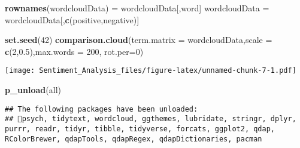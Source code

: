 \documentclass[
]{article}
\newenvironment{Shaded}{\begin{snugshade}}{\end{snugshade}}
\newcommand{\AttributeTok}[1]{\textcolor[rgb]{0.13,0.29,0.53}{#1}}
\newcommand{\DecValTok}[1]{\textcolor[rgb]{0.00,0.00,0.81}{#1}}
\newcommand{\FloatTok}[1]{\textcolor[rgb]{0.00,0.00,0.81}{#1}}
\newcommand{\FunctionTok}[1]{\textcolor[rgb]{0.13,0.29,0.53}{\textbf{#1}}}
\newcommand{\NormalTok}[1]{#1}
\newcommand{\OtherTok}[1]{\textcolor[rgb]{0.56,0.35,0.01}{#1}}
\newcommand{\StringTok}[1]{\textcolor[rgb]{0.31,0.60,0.02}{#1}}
\begin{document}
\begin{Shaded}
\begin{Highlighting}[]
\FunctionTok{rownames}\NormalTok{(wordcloudData) }\OtherTok{=}\NormalTok{ wordcloudData[,}\StringTok{\textquotesingle{}word\textquotesingle{}}\NormalTok{]}
\NormalTok{wordcloudData }\OtherTok{=}\NormalTok{ wordcloudData[,}\FunctionTok{c}\NormalTok{(}\StringTok{\textquotesingle{}positive\textquotesingle{}}\NormalTok{,}\StringTok{\textquotesingle{}negative\textquotesingle{}}\NormalTok{)]}

\FunctionTok{set.seed}\NormalTok{(}\DecValTok{42}\NormalTok{)}
\FunctionTok{comparison.cloud}\NormalTok{(}\AttributeTok{term.matrix =}\NormalTok{ wordcloudData,}\AttributeTok{scale =} \FunctionTok{c}\NormalTok{(}\DecValTok{2}\NormalTok{,}\FloatTok{0.5}\NormalTok{),}\AttributeTok{max.words =} \DecValTok{200}\NormalTok{, }\AttributeTok{rot.per=}\DecValTok{0}\NormalTok{)}
\end{Highlighting}
\end{Shaded}

\texttt{[image: Sentiment\_Analysis\_files/figure-latex/unnamed-chunk-7-1.pdf]}

\begin{Shaded}
\begin{Highlighting}[]
\FunctionTok{p\_unload}\NormalTok{(all)}
\end{Highlighting}
\end{Shaded}

\begin{verbatim}
## The following packages have been unloaded:
## psych, tidytext, wordcloud, ggthemes, lubridate, stringr, dplyr, purrr, readr, tidyr, tibble, tidyverse, forcats, ggplot2, qdap, RColorBrewer, qdapTools, qdapRegex, qdapDictionaries, pacman
\end{verbatim}
\end{document}

